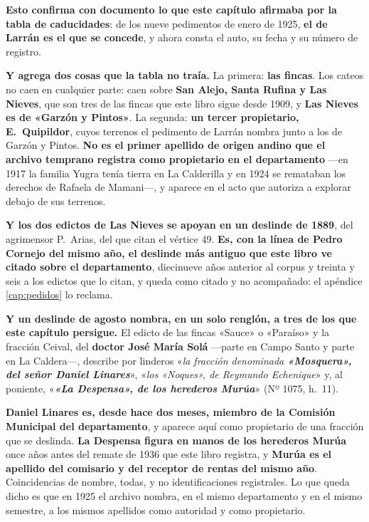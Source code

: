 \begin{cautela}
\textbf{Esto confirma con documento lo que este capítulo afirmaba por la tabla de caducidades}:
de los nueve pedimentos de enero de 1925, \textbf{el de Larrán es el que se concede}, y ahora
consta el auto, su fecha y su número de registro.

\textbf{Y agrega dos cosas que la tabla no traía.} La primera: \textbf{las fincas}. Los cateos no
caen en cualquier parte: caen sobre \textbf{San Alejo, Santa Rufina y Las Nieves}, que son tres de
las fincas que este libro sigue desde 1909, y \textbf{Las Nieves es de «Garzón y Pintos»}. La
segunda: \textbf{un tercer propietario, E.\ Quipildor}, cuyos terrenos el pedimento de Larrán
nombra junto a los de Garzón y Pintos. \textbf{No es el primer apellido de origen andino que el
archivo temprano registra como propietario en el departamento} ---en 1917 la familia Yugra tenía tierra en La Calderilla y en 1924 se remataban los derechos de Rafaela de Mamani---, y aparece en el acto
que autoriza a explorar debajo de sus terrenos.

\textbf{Y los dos edictos de Las Nieves se apoyan en un deslinde de 1889}, del agrimensor
P.\ Arias, del que citan el vértice 49. \textbf{Es, con la línea de Pedro Cornejo del mismo año, el deslinde más antiguo que este libro ve
citado sobre el departamento}, diecinueve años anterior al corpus y treinta y seis a los edictos que lo citan, y queda como citado y no
acompañado: el apéndice \ref{cap:pedidos} lo reclama.
\end{cautela}

\begin{cautela}
\textbf{Y un deslinde de agosto nombra, en un solo renglón, a tres de los que este capítulo
persigue.} El edicto de las fincas «Sauce» o «Paraíso» y la fracción Ceival, del \textbf{doctor
José María Solá} ---parte en Campo Santo y parte en La Caldera---, describe por linderos
«\textit{la fracción denominada \textbf{«Mosquera», del señor Daniel Linares}}»,
«\textit{los «Noques», de Reymundo Echenique}» y, al poniente, «\textit{\textbf{«La Despensa», de
los herederos Murúa}}» (Nº 1075, h.\ 11).

\textbf{Daniel Linares es, desde hace dos meses, miembro de la Comisión Municipal del
departamento}, y aparece aquí como propietario de una fracción que se deslinda. \textbf{La
Despensa figura en manos de los herederos Murúa} once años antes del remate de 1936 que este
libro registra, y \textbf{Murúa es el apellido del comisario y del receptor de rentas del mismo
año}. Coincidencias de nombre, todas, y no identificaciones registrales. Lo que queda dicho es
que en 1925 el archivo nombra, en el mismo departamento y en el mismo semestre, a los mismos
apellidos como autoridad y como propietario.
\end{cautela}

